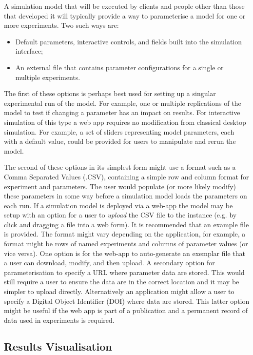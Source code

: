 \documentclass{swpaperproc}
\theoremstyle{sw}
\begin{document}
A simulation model that will be executed by clients and people other than those that developed it will typically provide a way to parameterise a model for one or more experiments.  Two such ways are:

\begin{itemize}
    \item Default parameters, interactive controls, and fields built into the simulation interface;
    \item An external file that contains parameter configurations for a single or multiple experiments.
\end{itemize}

The first of these options is perhaps best used for setting up a singular experimental run of the model.  For example, one or multiple replications of the model to test if changing a parameter has an impact on results.  For interactive simulation of this type a web app requires no modification from classical desktop simulation.  For example, a set of sliders representing model parameters, each with a default value, could be provided for users to manipulate and rerun the model.

The second of these options in its simplest form might use a format such as a Comma Separated Values (.CSV), containing a simple row and column format for experiment and parameters.  The user would populate (or more likely modify) these parameters in some way before a simulation model loads the parameters on each run.  If a simulation model is deployed via a web-app the model may be setup with an option for a user to \textit{upload} the CSV file to the instance (e.g. by click and dragging a file into a web form). It is recommended that an example file is provided. The format might vary depending on the application, for example, a format might be rows of named experiments and columns of parameter values (or vice versa). One option is for the web-app to auto-generate an exemplar file that a user can download, modify, and then upload.  A secondary option for parameterisation to specify a URL where parameter data are stored.  This would still require a user to ensure the data are in the correct location and it may be simpler to upload directly. Alternatively an application might allow a user to specify a Digital Object Identifier (DOI) where data are stored.  This latter option might be useful if the web app is part of a publication and a permanent record of data used in experiments is required.  


\subsection{Results Visualisation}
\end{document}
